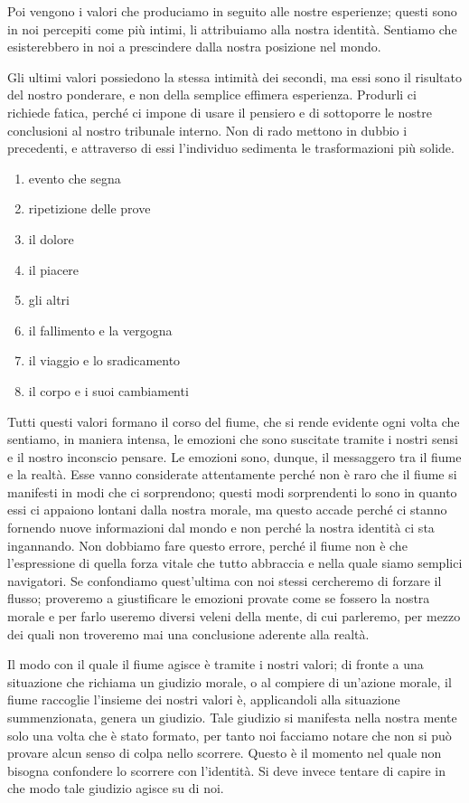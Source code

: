 Poi vengono i valori che produciamo in seguito alle nostre esperienze; questi sono in noi percepiti come più intimi, li attribuiamo
alla nostra identità. Sentiamo che esisterebbero in noi a prescindere dalla nostra posizione nel mondo.

Gli ultimi valori possiedono la stessa intimità dei secondi, ma essi sono il risultato del nostro ponderare, e non della semplice 
effimera esperienza. Produrli ci richiede fatica, perché ci impone di usare il pensiero e di sottoporre le nostre conclusioni al nostro tribunale
interno. Non di rado mettono in dubbio i precedenti, e attraverso di essi l'individuo sedimenta le trasformazioni più solide.\\
\begin{enumerate}
	\item evento che segna
	\item ripetizione delle prove
	\item il dolore
	\item il piacere
	\item gli altri
	\item il fallimento e la vergogna
	\item il viaggio e lo sradicamento
	\item il corpo e i suoi cambiamenti
\end{enumerate}

Tutti questi valori formano il corso del fiume, che si rende evidente ogni volta che sentiamo, in maniera intensa, le emozioni che sono suscitate tramite i nostri sensi e il nostro inconscio pensare.
Le emozioni sono, dunque, il messaggero tra il fiume e la realtà. Esse vanno considerate attentamente perché non è raro 
che il fiume si manifesti in modi che ci sorprendono; questi modi sorprendenti lo sono in quanto essi ci appaiono lontani dalla nostra morale, ma questo accade perché ci stanno fornendo nuove informazioni dal mondo e non perché la nostra identità ci sta ingannando. Non dobbiamo fare questo errore, perché il fiume non è che l'espressione di quella forza vitale che tutto abbraccia e nella quale siamo semplici navigatori. Se confondiamo quest'ultima con noi stessi
cercheremo di forzare il flusso; proveremo a giustificare le emozioni provate come se fossero la nostra morale e per farlo useremo diversi veleni della mente, di cui parleremo, per mezzo dei quali non troveremo mai una conclusione aderente alla realtà.

Il modo con il quale il fiume agisce è tramite i nostri valori; di fronte a una situazione che richiama un giudizio morale, o al compiere di un'azione morale,
il fiume raccoglie l'insieme dei nostri valori è, applicandoli alla situazione summenzionata, genera un giudizio. Tale giudizio si manifesta nella nostra mente
solo una volta che è stato formato, per tanto noi facciamo notare che non si può provare alcun senso di colpa nello scorrere. Questo è il momento nel quale non
bisogna confondere lo scorrere con l'identità. Si deve invece tentare di capire in che modo tale giudizio agisce su di noi.

